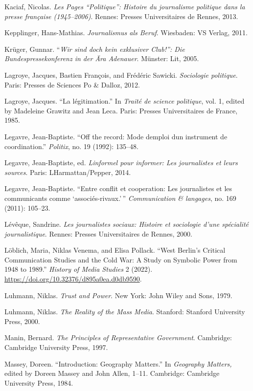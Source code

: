 \documentclass{tufte-handout}
\begin{document}
\begin{hangparas}{.25in}{1}
Kaciaf, Nicolas. \emph{Les Pages ``Politique'': Histoire du journalisme
politique dans la presse française (1945--2006)}. Rennes: Presses
Universitaires de Rennes, 2013.

Kepplinger, Hans-Mathias. \emph{Journalismus als Beruf}. Wiesbaden: VS
Verlag, 2011.

Krüger, Gunnar. ``\emph{Wir sind doch kein exklusiver Club!'': Die
Bundespressekonferenz in der Ära Adenauer}. Münster: Lit, 2005.

Lagroye, Jacques, Bastien François, and Frédéric Sawicki.
\emph{Sociologie politique}. Paris: Presses de Sciences Po \& Dalloz,
2012.

Lagroye, Jacques. ``La légitimation.'' In \emph{Traité de science
politique}, vol. 1, edited by Madeleine Grawitz and Jean Leca. Paris:
Presses Universitaires de France, 1985.

Legavre, Jean-Baptiste. ``Off the record: Mode d\textquotesingle emploi
d\textquotesingle un instrument de coordination.'' \emph{Politix}, no.
19 (1992): 135--48.

Legavre, Jean-Baptiste, ed. \emph{L\textquotesingle informel pour
informer: Les journalistes et leurs sources}. Paris:
L\textquotesingle Harmattan/Pepper, 2014.

Legavre, Jean-Baptiste. ``Entre conflit et cooperation: Les journalistes
et les communicants comme `associés-rivaux.'\,'' \emph{Communication \&
langages}, no. 169 (2011): 105--23.

Lévêque, Sandrine. \emph{Les journalistes sociaux: Histoire et
sociologie d'une spécialité journalistique}. Rennes: Presses
Universitaires de Rennes, 2000.

Löblich, Maria, Niklas Venema, and Elisa Pollack. ``West Berlin's
Critical Communication Studies and the Cold War: A Study on Symbolic
Power from 1948 to 1989.'' \emph{History of Media Studies} 2 (2022).
\url{https://doi.org/10.32376/d895a0ea.d0db9590}.

Luhmann, Niklas. \emph{Trust and Power}. New York: John Wiley and Sons,
1979.

Luhmann, Niklas. \emph{The Reality of the Mass Media}. Stanford:
Stanford University Press, 2000.

Manin, Bernard. \emph{The Principles of Representative Government}.
Cambridge: Cambridge University Press, 1997.

Massey, Doreen. ``Introduction: Geography Matters.'' In \emph{Geography
Matters,} edited by Doreen Massey and John Allen, 1--11. Cambridge:
Cambridge University Press, 1984.


\end{hangparas}
\end{document}

